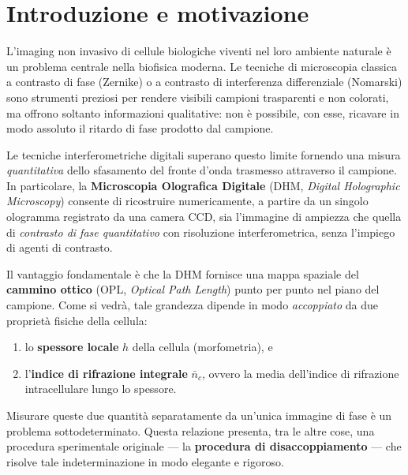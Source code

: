 
\section{Introduzione e motivazione}

L'imaging non invasivo di cellule biologiche viventi nel loro ambiente naturale è un
problema centrale nella biofisica moderna. Le tecniche di microscopia classica a
contrasto di fase (Zernike) o a contrasto di interferenza differenziale (Nomarski) sono
strumenti preziosi per rendere visibili campioni trasparenti e non colorati, ma offrono
soltanto informazioni qualitative: non è possibile, con esse, ricavare in modo assoluto
il ritardo di fase prodotto dal campione.

Le tecniche interferometriche digitali superano questo limite fornendo una misura
\emph{quantitativa} dello sfasamento del fronte d'onda trasmesso attraverso il
campione. In particolare, la \textbf{Microscopia Olografica Digitale} (DHM,
\textit{Digital Holographic Microscopy}) consente di ricostruire numericamente, a
partire da un singolo ologramma registrato da una camera CCD, sia l'immagine di
ampiezza che quella di \emph{contrasto di fase quantitativo} con risoluzione
interferometrica, senza l'impiego di agenti di contrasto.

Il vantaggio fondamentale è che la DHM fornisce una mappa spaziale del
\textbf{cammino ottico} (OPL, \textit{Optical Path Length}) punto per punto nel piano
del campione. Come si vedrà, tale grandezza dipende in modo \emph{accoppiato} da
due proprietà fisiche della cellula:
\begin{enumerate}
  \item lo \textbf{spessore locale} $h$ della cellula (morfometria), e
  \item l'\textbf{indice di rifrazione integrale} $\bar{n}_c$, ovvero la media
        dell'indice di rifrazione intracellulare lungo lo spessore.
\end{enumerate}

Misurare queste due quantità separatamente da un'unica immagine di fase è un
problema sottodeterminato. Questa relazione presenta, tra le altre cose, una procedura sperimentale
originale — la \textbf{procedura di disaccoppiamento} — che risolve tale
indeterminazione in modo elegante e rigoroso. %

